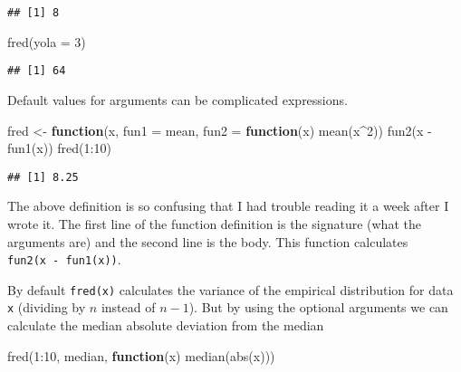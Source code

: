 \documentclass[
]{article}
\newenvironment{Shaded}{\begin{snugshade}}{\end{snugshade}}
\newcommand{\AttributeTok}[1]{\textcolor[rgb]{0.77,0.63,0.00}{#1}}
\newcommand{\ControlFlowTok}[1]{\textcolor[rgb]{0.13,0.29,0.53}{\textbf{#1}}}
\newcommand{\DecValTok}[1]{\textcolor[rgb]{0.00,0.00,0.81}{#1}}
\newcommand{\FunctionTok}[1]{\textcolor[rgb]{0.00,0.00,0.00}{#1}}
\newcommand{\NormalTok}[1]{#1}
\newcommand{\OtherTok}[1]{\textcolor[rgb]{0.56,0.35,0.01}{#1}}
\newcommand{\SpecialCharTok}[1]{\textcolor[rgb]{0.00,0.00,0.00}{#1}}
\begin{document}
\begin{verbatim}
## [1] 8
\end{verbatim}

\begin{Shaded}
\begin{Highlighting}[]
\FunctionTok{fred}\NormalTok{(}\AttributeTok{yola =} \DecValTok{3}\NormalTok{)}
\end{Highlighting}
\end{Shaded}

\begin{verbatim}
## [1] 64
\end{verbatim}

Default values for arguments can be complicated expressions.

\begin{Shaded}
\begin{Highlighting}[]
\NormalTok{fred }\OtherTok{\textless{}{-}} \ControlFlowTok{function}\NormalTok{(x, }\AttributeTok{fun1 =}\NormalTok{ mean, }\AttributeTok{fun2 =} \ControlFlowTok{function}\NormalTok{(x) }\FunctionTok{mean}\NormalTok{(x}\SpecialCharTok{\^{}}\DecValTok{2}\NormalTok{))}
    \FunctionTok{fun2}\NormalTok{(x }\SpecialCharTok{{-}} \FunctionTok{fun1}\NormalTok{(x))}
\FunctionTok{fred}\NormalTok{(}\DecValTok{1}\SpecialCharTok{:}\DecValTok{10}\NormalTok{)}
\end{Highlighting}
\end{Shaded}

\begin{verbatim}
## [1] 8.25
\end{verbatim}

The above definition is so confusing that I had trouble reading it a
week after I wrote it. The first line of the function definition is the
signature (what the arguments are) and the second line is the body. This
function calculates \texttt{fun2(x\ -\ fun1(x))}.

By default \texttt{fred(x)} calculates the variance of the empirical
distribution for data \texttt{x} (dividing by \(n\) instead of
\(n - 1\)). But by using the optional arguments we can calculate the
median absolute deviation from the median

\begin{Shaded}
\begin{Highlighting}[]
\FunctionTok{fred}\NormalTok{(}\DecValTok{1}\SpecialCharTok{:}\DecValTok{10}\NormalTok{, median, }\ControlFlowTok{function}\NormalTok{(x) }\FunctionTok{median}\NormalTok{(}\FunctionTok{abs}\NormalTok{(x)))}
\end{Highlighting}
\end{Shaded}
\end{document}
